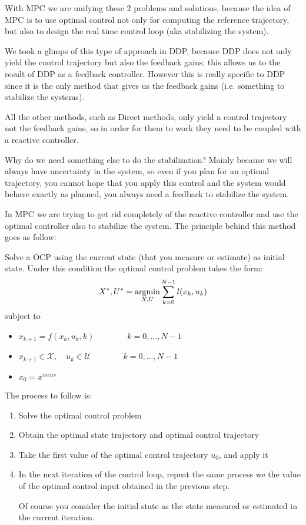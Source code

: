 With MPC we are unifying these 2 problems and solutions, because the idea of MPC is to use optimal control not only for computing the reference trajectory, but also to design the real time control loop (aka stabilizing the system).

We took a glimps of this type of approach in DDP, because DDP does not only yield the control trajectory but also the feedback gains: this allows us to the result of DDP as a feedback controller. However this is really specific to DDP since it is the only method that gives us the feedback gains (i.e. something to stabilize the systems).

All the other methods, such as Direct methods, only yield a control trajectory not the feedback gains, so in order for them to work they need to be coupled with a reactive controller.

Why do we need something else to do the stabilization? Mainly because we will always have uncertainty in the system, so even if you plan for an optimal trajectory, you cannot hope that you apply this control and the system would behave exactly as planned, you always need a feedback to stabilize the system.

In MPC we are trying to get rid completely of the reactive controller and use the optimal controller also to stabilize the system. The principle behind this method goes as follow:

Solve a  OCP using the current state (that you measure or estimate) as initial state. Under this condition the optimal control problem takes the form:
\[X^*, U^* = \operatorname*{argmin}_{X,U} \sum_{k=0}^{N-1} l(x_k, u_k)\]
subject to
\begin{itemize}
\item $x_{k+1} = f(x_k, u_k, k)\qquad\qquad k=0,...,N-1$
\item $x_{k+1}\in\mathcal{X}, \quad u_k\in\mathcal{U}\qquad\qquad k = 0,...,N-1$
\item $x_0 = x^{meas}$
\end{itemize}
The process to follow is:
\begin{enumerate}
\item Solve the optimal control problem
\item Obtain the optimal state trajectory and optimal control trajectory 
\item Take the first value of the optimal control trajectory $u_0$, and apply it
\item In the next iteration of the control loop, repeat the same process we the value of the optimal control input obtained in the previous step.

Of course you consider the initial state as the state measured or estimated in the current iteration.
\end{enumerate}

